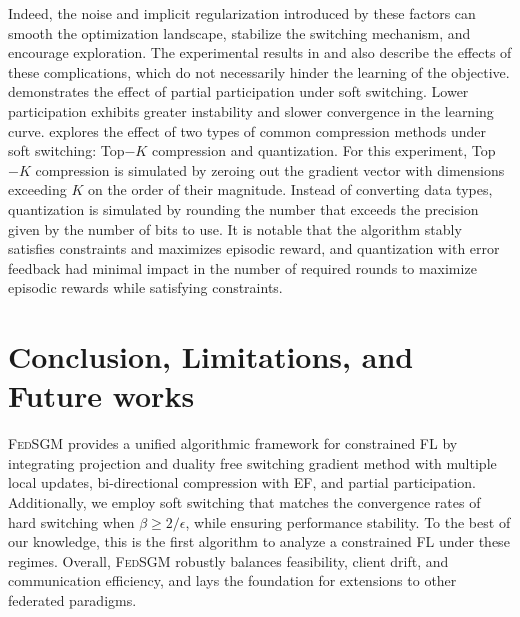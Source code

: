 \documentclass{article} %
\begin{document}
Indeed, the noise and implicit regularization introduced by these factors can smooth the optimization landscape, stabilize the switching mechanism, and encourage exploration. The experimental results in \cite{islamov2025safe} and \cite{Li2020On} also describe the effects of these complications, which do not necessarily hinder the learning of the objective.  demonstrates the effect of partial participation under soft switching. Lower participation exhibits greater instability and slower convergence in the learning curve.  explores the effect of two types of common compression methods under soft switching: Top$-K$ compression and quantization. For this experiment, Top$-K$ compression is simulated by zeroing out the gradient vector with dimensions exceeding $K$ on the order of their magnitude. Instead of converting data types, quantization is simulated by rounding the number that exceeds the precision given by the number of bits to use. It is notable that the algorithm stably satisfies constraints and maximizes episodic reward, and quantization with error feedback had minimal impact in the number of required rounds to maximize episodic rewards while satisfying constraints.
\vspace{-1mm}
\section{Conclusion, Limitations, and Future works}
\vspace{-1mm}
\label{sec:conclusion}
\textsc{FedSGM} provides a unified algorithmic framework for constrained FL by integrating projection and duality free switching gradient method with multiple local updates, bi-directional compression with EF, and partial participation. Additionally, we employ soft switching that matches the convergence rates of hard switching when $\beta \geq 2/\epsilon$, while ensuring performance stability. To the best of our knowledge, this is the first algorithm to analyze a constrained FL under these regimes. Overall, \textsc{FedSGM} robustly balances feasibility, client drift, and communication efficiency, and lays the foundation for extensions to other federated paradigms.
\end{document}
